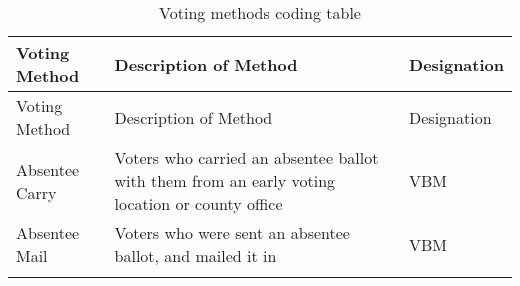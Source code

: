 \documentclass[12pt,twoside]{reedthesis}
\begin{document}
  \begin{longtable}[]{@{}lll@{}}
  \caption{Voting methods coding table
  \label{tab:voting_methods_table}}\tabularnewline
  \toprule
  \begin{minipage}[b]{0.22\columnwidth}\raggedright\strut
  Voting Method\strut
  \end{minipage} & \begin{minipage}[b]{0.42\columnwidth}\raggedright\strut
  Description of Method\strut
  \end{minipage} & \begin{minipage}[b]{0.18\columnwidth}\raggedright\strut
  Designation\strut
  \end{minipage}\tabularnewline
  \midrule
  \endfirsthead
  \toprule
  \begin{minipage}[b]{0.22\columnwidth}\raggedright\strut
  Voting Method\strut
  \end{minipage} & \begin{minipage}[b]{0.42\columnwidth}\raggedright\strut
  Description of Method\strut
  \end{minipage} & \begin{minipage}[b]{0.18\columnwidth}\raggedright\strut
  Designation\strut
  \end{minipage}\tabularnewline
  \midrule
  \endhead
  \begin{minipage}[t]{0.22\columnwidth}\raggedright\strut
  Absentee Carry\strut
  \end{minipage} & \begin{minipage}[t]{0.42\columnwidth}\raggedright\strut
  Voters who carried an absentee ballot with them from an early voting
  location or county office\strut
  \end{minipage} & \begin{minipage}[t]{0.18\columnwidth}\raggedright\strut
  VBM\strut
  \end{minipage}\tabularnewline
  \begin{minipage}[t]{0.22\columnwidth}\raggedright\strut
  Absentee Mail\strut
  \end{minipage} & \begin{minipage}[t]{0.42\columnwidth}\raggedright\strut
  Voters who were sent an absentee ballot, and mailed it in\strut
  \end{minipage} & \begin{minipage}[t]{0.18\columnwidth}\raggedright\strut
  VBM\strut
  \end{minipage}\tabularnewline
  \begin{minipage}[t]{0.22\columnwidth}\raggedright\strut

\end{minipage}
\end{longtable}
\end{document}
